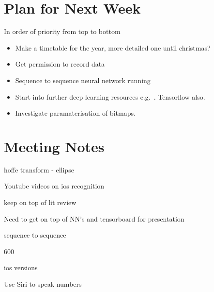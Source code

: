\documentclass[]{weekly-report}
\begin{document}
\section{Plan for Next Week}
In order of priority from top to bottom

\begin{itemize}
\item Make a timetable for the year, more detailed one until christmas?

\item Get permission to record data

\item Sequence to sequence neural network running

\item Start into further deep learning resources e.g.~\cite{Ng-Coursera-2016, VincentVanhoucke-Udacity-2016, Nvidia-DL-Course-2016}. Tensorflow also.

\item Investigate paramaterisation of bitmaps.

\end{itemize}

\section{Meeting Notes}


hoffe transform - ellipse

Youtube videos on ios recognition

keep on top of lit review

Need to get on top of NN's and tensorboard for presentation

sequence to sequence

600

ios versions

Use Siri to speak numbers


{}



\label{last_page}

 
\end{document}
